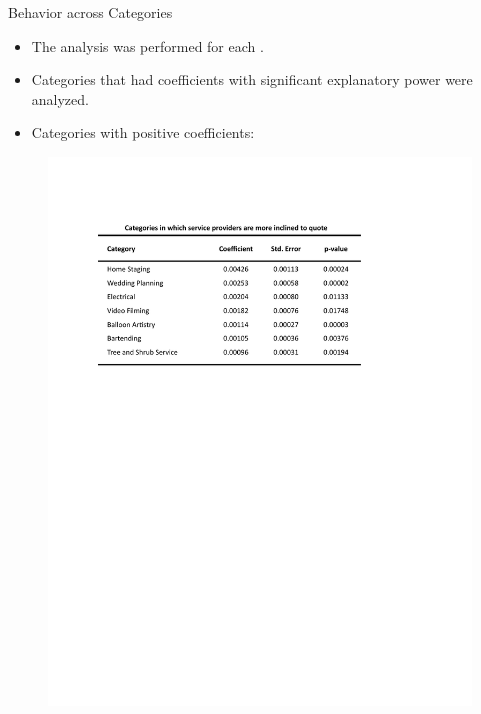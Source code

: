 \documentclass{beamer}
\begin{document}
\begin{frame}{Behavior across Categories}{}
	\vspace{0 in}
	\begin{itemize}
		\item {The analysis was performed for each {\color{blue}{Category}}.}\newline
		\item{Categories that had coefficients with significant explanatory power were analyzed.}\newline
		\item {Categories with positive coefficients:}\newline 
	\end{itemize}
		\vspace{-0.3 in}
	\begin{figure}{}
		\vspace*{-0 in}
		\scalebox{1}
		{\hspace*{-0 in}\includegraphics[scale=0.7]{coef_cat_more.pdf} }
	\end{figure}	
	\vspace*{-0 in}
\end{frame}
		
\end{document}
